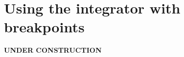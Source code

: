 \newpage
\section{Using the integrator with breakpoints}
\label{sec:app_integrator}

{\bf \large UNDER CONSTRUCTION}
